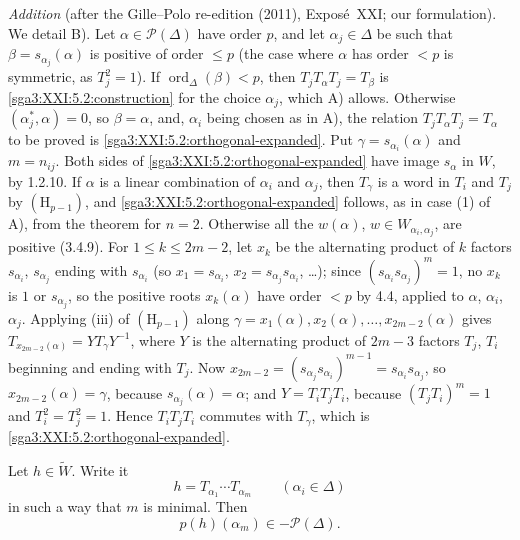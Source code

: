 \emph{Addition} (after the Gille--Polo re-edition (2011), Exposé~XXI; our
formulation). We detail B). Let \(\alpha\in\mathscr{P}(\Delta)\) have order \(p\), and
let \(\alpha_j\in\Delta\) be such that \(\beta=s_{\alpha_j}(\alpha)\) is positive of order
\(\leq p\) (the case where \(\alpha\) has order \(<p\) is symmetric, as \(T_j^2=1\)). If
\(\operatorname{ord}_\Delta(\beta)<p\), then \(T_jT_\alpha T_j=T_\beta\) is
\eqref{sga3:XXI:5.2:construction} for the choice \(\alpha_j\), which A) allows. Otherwise
\((\alpha_j^\ast,\alpha)=0\), so \(\beta=\alpha\), and, \(\alpha_i\) being chosen as in A),
the relation \(T_jT_\alpha T_j=T_\alpha\) to be proved is
\eqref{sga3:XXI:5.2:orthogonal-expanded}. Put \(\gamma=s_{\alpha_i}(\alpha)\) and
\(m=n_{ij}\). Both sides of \eqref{sga3:XXI:5.2:orthogonal-expanded} have image
\(s_\alpha\) in \(W\), by 1.2.10. If \(\alpha\) is a linear combination of \(\alpha_i\)
and \(\alpha_j\), then \(T_\gamma\) is a word in \(T_i\) and \(T_j\) by
\((\mathrm{H}_{p-1})\), and \eqref{sga3:XXI:5.2:orthogonal-expanded} follows, as in case
(1) of A), from the theorem for \(n=2\). Otherwise all the \(w(\alpha)\),
\(w\in W_{\alpha_i,\alpha_j}\), are positive (3.4.9). For \(1\leq k\leq2m-2\), let \(x_k\)
be the alternating product of \(k\) factors \(s_{\alpha_i}\), \(s_{\alpha_j}\) ending
with \(s_{\alpha_i}\) (so \(x_1=s_{\alpha_i}\), \(x_2=s_{\alpha_j}s_{\alpha_i}\), \ldots);
since \((s_{\alpha_i}s_{\alpha_j})^m=1\), no \(x_k\) is \(1\) or \(s_{\alpha_j}\), so the
positive roots \(x_k(\alpha)\) have order \(<p\) by 4.4, applied to \(\alpha\),
\(\alpha_i\), \(\alpha_j\). Applying (iii) of \((\mathrm{H}_{p-1})\) along
\(\gamma=x_1(\alpha),x_2(\alpha),\ldots,x_{2m-2}(\alpha)\) gives
\(T_{x_{2m-2}(\alpha)}=YT_\gamma Y^{-1}\), where \(Y\) is the alternating product of
\(2m-3\) factors \(T_j\), \(T_i\) beginning and ending with \(T_j\). Now
\(x_{2m-2}=(s_{\alpha_j}s_{\alpha_i})^{m-1}=s_{\alpha_i}s_{\alpha_j}\), so
\(x_{2m-2}(\alpha)=\gamma\), because \(s_{\alpha_j}(\alpha)=\alpha\); and \(Y=T_iT_jT_i\),
because \((T_jT_i)^m=1\) and \(T_i^2=T_j^2=1\). Hence \(T_iT_jT_i\) commutes with
\(T_\gamma\), which is \eqref{sga3:XXI:5.2:orthogonal-expanded}.

\begin{lemma}\label{sga3:XXI:5.3}
Let \(h\in\widetilde W\). Write it
\[
 h=T_{\alpha_1}\cdots T_{\alpha_m}\qquad(\alpha_i\in\Delta)
\]
in such a way that \(m\) is minimal. Then
\[
 p(h)(\alpha_m)\in-\mathscr{P}(\Delta).
\]
\end{lemma}

